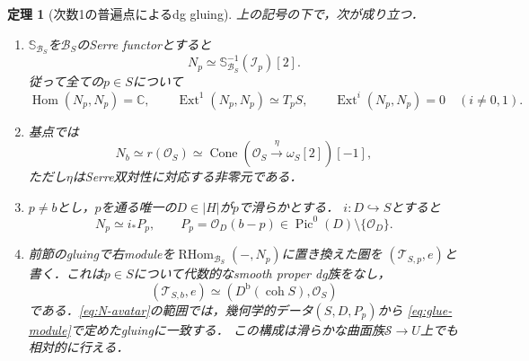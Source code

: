 \documentclass[11pt,a4paper]{ltjsarticle}
\newtheorem{theorem}{定理}[section]
\theoremstyle{definition}
\newcommand{\OO}{\mathcal O}
\newcommand{\BB}{\mathcal B}
\newcommand{\TT}{\mathcal T}
\newcommand{\SSer}{\mathbb S}
\newcommand{\Db}{D^{\mathrm b}}
\newcommand{\RHom}{\operatorname{RHom}}
\newcommand{\Hom}{\operatorname{Hom}}
\newcommand{\Ext}{\operatorname{Ext}}
\newcommand{\coh}{\operatorname{coh}}
\newcommand{\Pic}{\operatorname{Pic}}
\begin{document}
\begin{theorem}[次数1の普遍点によるdg gluing]
\label{thm:universal-gluing}
上の記号の下で，次が成り立つ．
\begin{enumerate}
\item $\SSer_{\BB_S}$を$\BB_S$のSerre functorとすると
\begin{equation}\label{eq:Np-serre}
 N_p\simeq\SSer_{\BB_S}^{-1}(\mathcal I_p)[2].
\end{equation}
従って全ての$p\in S$について
\begin{equation}\label{eq:Np-ext}
 \Hom(N_p,N_p)=\mathbb C,\qquad
 \Ext^1(N_p,N_p)\simeq T_pS,\qquad
 \Ext^i(N_p,N_p)=0\quad(i\ne0,1).
\end{equation}
\item 基点では
\begin{equation}\label{eq:N-basepoint}
 N_b\simeq r(\OO_S)
 \simeq\operatorname{Cone}(\OO_S\xrightarrow{\eta}\omega_S[2])[-1],
\end{equation}
ただし$\eta$はSerre双対性に対応する非零元である．
\item $p\ne b$とし，$p$を通る唯一の$D\in|H|$が$p$で滑らかとする．
$i:D\hookrightarrow S$とすると
\begin{equation}\label{eq:N-avatar}
 N_p\simeq i_*P_p,\qquad
 P_p=\OO_D(b-p)\in\Pic^0(D)\setminus\{\OO_D\}.
\end{equation}
\item 前節のgluingで右moduleを$\RHom_{\BB_S}(-,N_p)$に置き換えた圏を
$(\TT_{S,p},e)$と書く．これは$p\in S$について代数的なsmooth proper dg族をなし，
\[
 (\TT_{S,b},e)\simeq(\Db(\coh S),\OO_S)
\]
である．\eqref{eq:N-avatar}の範囲では，幾何学的データ$(S,D,P_p)$から
\eqref{eq:glue-module}で定めたgluingに一致する．
この構成は滑らかな曲面族$\mathcal S\to U$上でも相対的に行える．
\end{enumerate}
\end{theorem}
\end{document}
